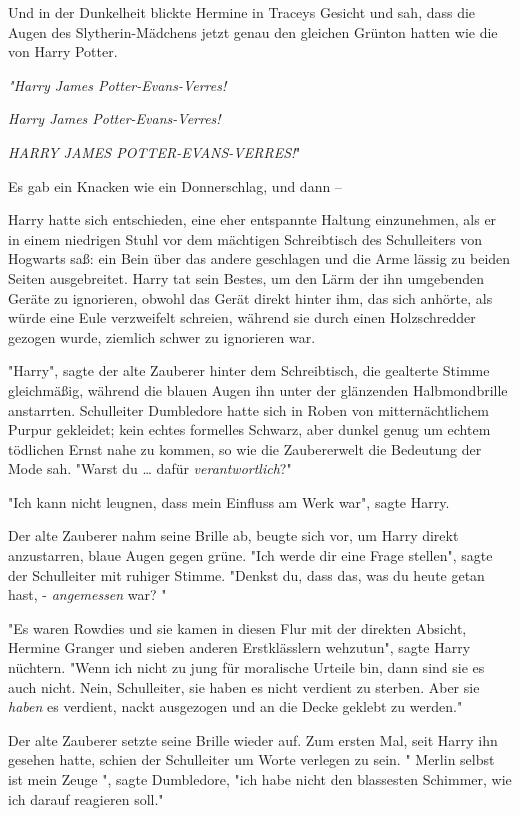 {Und in der Dunkelheit blickte Hermine in Traceys Gesicht und sah, dass die Augen des Slytherin-Mädchens jetzt genau den gleichen Grünton hatten wie die von Harry Potter.

\emph{"\emph{Harry James Potter-Evans-Verres!}}

\emph{Harry James Potter-Evans-Verres!}

\emph{HARRY JAMES POTTER-EVANS-VERRES!}"

Es gab ein Knacken wie ein Donnerschlag, und dann --

Harry hatte sich entschieden, eine eher entspannte Haltung einzunehmen, als er in einem niedrigen Stuhl vor dem mächtigen Schreibtisch des Schulleiters von Hogwarts saß: ein Bein über das andere geschlagen und die Arme lässig zu beiden Seiten ausgebreitet. Harry tat sein Bestes, um den Lärm der ihn umgebenden Geräte zu ignorieren, obwohl das Gerät direkt hinter ihm, das sich anhörte, als würde eine Eule verzweifelt schreien, während sie durch einen Holzschredder gezogen wurde, ziemlich schwer zu ignorieren war.

"Harry", sagte der alte Zauberer hinter dem Schreibtisch, die gealterte Stimme gleichmäßig, während die blauen Augen ihn unter der glänzenden Halbmondbrille anstarrten. Schulleiter Dumbledore hatte sich in Roben von mitternächtlichem Purpur gekleidet; kein echtes formelles Schwarz, aber dunkel genug um echtem tödlichen Ernst nahe zu kommen, so wie die Zaubererwelt die Bedeutung der Mode sah. "Warst du … dafür \emph{verantwortlich}?"

"Ich kann nicht leugnen, dass mein Einfluss am Werk war", sagte Harry.

Der alte Zauberer nahm seine Brille ab, beugte sich vor, um Harry direkt anzustarren, blaue Augen gegen grüne. "Ich werde dir eine Frage stellen", sagte der Schulleiter mit ruhiger Stimme. "Denkst du, dass das, was du heute getan hast, - \emph{angemessen} war? "

"Es waren Rowdies und sie kamen in diesen Flur mit der direkten Absicht, Hermine Granger und sieben anderen Erstklässlern wehzutun", sagte Harry nüchtern. "Wenn ich nicht zu jung für moralische Urteile bin, dann sind sie es auch nicht. Nein, Schulleiter, sie haben es nicht verdient zu sterben. Aber sie \emph{haben} es verdient, nackt ausgezogen und an die Decke geklebt zu werden."

Der alte Zauberer setzte seine Brille wieder auf. Zum ersten Mal, seit Harry ihn gesehen hatte, schien der Schulleiter um Worte verlegen zu sein. " Merlin selbst ist mein Zeuge ", sagte Dumbledore, "ich habe nicht den blassesten Schimmer, wie ich darauf reagieren soll."

}
